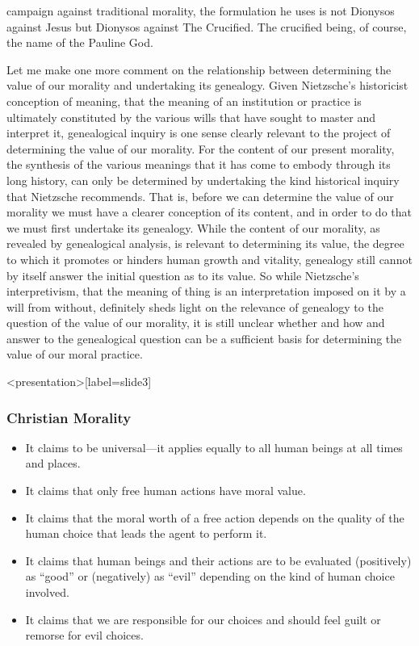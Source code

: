 campaign against traditional morality, the formulation he uses is not Dionysos against Jesus but Dionysos against The Crucified. The crucified being, of course, the name of the Pauline God.

Let me make one more comment on the relationship between determining the value of our morality and undertaking its genealogy. Given Nietzsche's historicist conception of meaning, that the meaning of an institution or practice is ultimately constituted by the various wills that have sought to master and interpret it, genealogical inquiry is one sense clearly relevant to the project of determining the value of our morality. For the content of our present morality, the synthesis of the various meanings that it has come to embody through its long history, can only be determined by undertaking the kind historical inquiry that Nietzsche recommends. That is, before we can determine the value of our morality we must have a clearer conception of its content, and in order to do that we must first undertake its genealogy. While the content of our morality, as revealed by genealogical analysis, is relevant to determining its value, the degree to which it promotes or hinders human growth and vitality, genealogy still cannot by itself answer the initial question as to its value. So while Nietzsche's interpretivism, that the meaning of thing is an interpretation imposed on it by a will from without, definitely sheds light on the relevance of genealogy to the question of the value of our morality, it is still unclear whether and how and answer to the genealogical question can be a sufficient basis for determining the value of our moral practice. \change

\begin{frame}<presentation>[label=slide3]
    \frametitle{Christian Morality}
        \begin{itemize}
        	\item It claims to be universal---it applies equally to all human beings at all times and places.
        	\item It claims that only free human actions have moral value.
        	\item It claims that the moral worth of a free action depends on the quality of the human choice that leads the agent to perform it.
        	\item It claims that human beings and their actions are to be evaluated (positively) as  ``good'' or (negatively) as  ``evil'' depending on the kind of human choice involved.
        	\item It claims that we are responsible for our choices and should feel guilt or remorse for evil choices.
        \end{itemize}
\end{frame}

